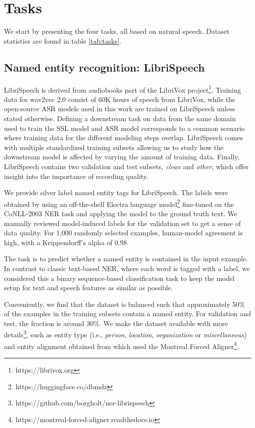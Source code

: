 \documentclass{article}
\begin{document}
\section{Tasks}
\label{sec:tasks}

We start by presenting the four tasks, all based on natural speech. Dataset statistics are found in table \ref{tab:tasks}. 


\subsection{Named entity recognition: LibriSpeech}
\label{sec:ner-task}





LibriSpeech \cite{panayotov2015librispeech} is derived from audiobooks part of the LibriVox project\footnote{https://librivox.org}. Training data for wav2vec 2.0 consist of 60K hours of speech from LibriVox, while the open-source ASR models used in this work are trained on LibriSpeech unless stated otherwise. Defining a downstream task on data from the same domain used to train the SSL model and ASR model corresponds to a common scenario where training data for the different modeling steps overlap. LibriSpeech comes with multiple standardized training subsets \cite{kahn2020libri} allowing us to study how the downstream model is affected by varying the amount of training data. Finally, LibriSpeech contains two validation and test subsets, \textit{clean} and \textit{other}, which offer insight into the importance of recording quality.


We provide silver label named entity tags for LibriSpeech. The labels were obtained by using an off-the-shelf Electra language model\footnote{https://huggingface.co/dbmdz} fine-tuned on the CoNLL-2003 NER task \cite{clark2019electra, wolf2019huggingface} and applying the model to the ground truth text. We manually reviewed model-induced labels for the validation set to get a sense of data quality. For 1,000 randomly selected examples, human-model agreement is high, with a Krippendorff's alpha of 0.98.

The task is to predict whether a named entity is contained in the input example. In contrast to classic text-based NER, where each word is tagged with a label, we considered this a binary sequence-based classification task to keep the model setup for text and speech features as similar as possible.

Conveniently, we find that the dataset is balanced such that approximately 50\% of the examples in the training subsets contain a named entity. For validation and test, the fraction is around 30\%. We make the dataset available with more details\footnote{https://github.com/borgholt/ner-librispeech}, such as entity type (i.e., \textit{person}, \textit{location}, \textit{organization} or \textit{miscellaneous}) and entity alignment obtained from \cite{lugosch2019speech} which used the Montreal Forced Aligner\footnote{https://montreal-forced-aligner.readthedocs.io}.
\end{document}
